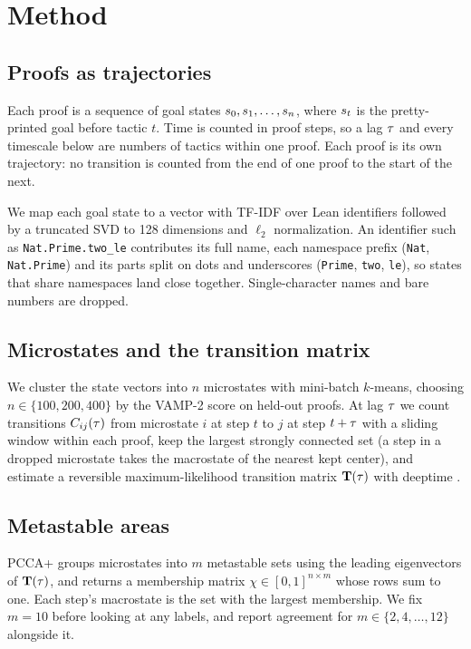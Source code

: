 \section{Method}
\label{sec:method}

\subsection{Proofs as trajectories}
Each proof is a sequence of goal states $s_0, s_1, \dots, s_n$,
where $s_t$ is the pretty-printed goal before tactic $t$. Time is counted
in proof steps, so a lag $\tau$ and every timescale below are numbers of
tactics within one proof. Each proof is its own trajectory: no transition is
counted from the end of one proof to the start of the next.

We map each goal state to a vector with TF-IDF over Lean identifiers followed
by a truncated SVD to 128 dimensions and $\ell_2$ normalization. An
identifier such as \texttt{Nat.Prime.two\_le} contributes its full name, each
namespace prefix (\texttt{Nat}, \texttt{Nat.Prime}) and its parts split on
dots and underscores (\texttt{Prime}, \texttt{two}, \texttt{le}), so states
that share namespaces land close together. Single-character names and bare
numbers are dropped. 

\subsection{Microstates and the transition matrix}
We cluster the state vectors into $n$ microstates with mini-batch $k$-means,
choosing $n \in \{100, 200, 400\}$ by the VAMP-2 score on held-out proofs.
At lag $\tau$ we count transitions $C_{ij}(\tau)$ from microstate $i$ at step
$t$ to $j$ at step $t+\tau$ with a sliding window within each proof, keep the
largest strongly connected set (a step in a dropped microstate takes the
macrostate of the nearest kept center), and estimate a reversible maximum-likelihood
transition matrix $\mathbf{T}(\tau)$ with deeptime \citep{hoffmann2022deeptime}.

\subsection{Metastable areas}
PCCA+ \citep{deuflhard2005pcca,roblitz2013fuzzy} groups microstates into
$m$ metastable sets using the leading eigenvectors of $\mathbf{T}(\tau)$, and returns
a membership matrix $\chi \in [0,1]^{n \times m}$ whose rows sum to one. Each
step's macrostate is the set with the largest membership. We fix $m = 10$
before looking at any labels, and report agreement for
$m \in \{2, 4, \dots, 12\}$ alongside it.

